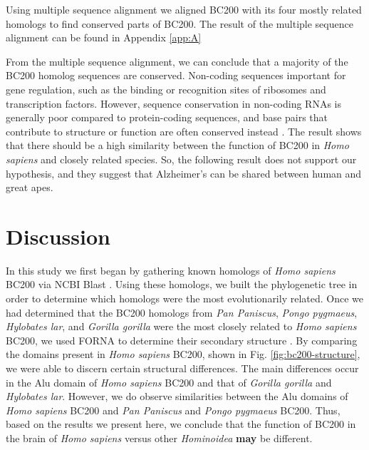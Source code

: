\documentclass[conference, 11pt]{IEEEtran}
\begin{document}
Using multiple sequence alignment we aligned BC200 with its four mostly related homologs to find conserved parts of BC200. 
The result of the multiple sequence alignment can be found in Appendix \ref{app:A}

From the multiple sequence alignment, we can conclude that a majority of the BC200 homolog sequences are conserved. 
Non-coding sequences important for gene regulation, such as the binding or recognition sites of ribosomes and transcription factors. 
However, sequence conservation in non-coding RNAs is generally poor compared to protein-coding sequences, and base pairs that contribute to structure or function are often conserved instead \cite{johnsson2014evolutionary}. 
The result shows that there should be a high similarity between the function of BC200 in \emph{Homo sapiens} and closely related species. 
So, the following result does not support our hypothesis, and they suggest that Alzheimer’s can be shared between human and great apes.

\section{Discussion}\label{sec:discussion}

In this study we first began by gathering known homologs of \emph{Homo sapiens} BC200 via NCBI Blast \cite{blastTool,madden2012blast}. 
Using these homologs, we built the phylogenetic tree in order to determine which homologs were the most evolutionarily related. 
Once we had determined that the BC200 homologs from \emph{Pan Paniscus}, \emph{Pongo pygmaeus}, \emph{Hylobates lar}, and \emph{Gorilla gorilla} were the most closely related to \emph{Homo sapiens} BC200, we used FORNA to determine their secondary structure \cite{lorenz2011viennarna}. 
By comparing the domains present in \emph{Homo sapiens} BC200, shown in Fig. \ref{fig:bc200-structure}, we were able to discern certain structural differences. 
The main differences occur in the Alu domain of \emph{Homo sapiens} BC200 and that of \emph{Gorilla gorilla} and \emph{Hylobates lar}. 
However, we do observe similarities between the Alu domains of \emph{Homo sapiens} BC200 and \emph{Pan Paniscus} and \emph{Pongo pygmaeus} BC200. 
Thus, based on the results we present here, we conclude that the function of BC200 in the brain of \emph{Homo sapiens} versus other \emph{Hominoidea} \textbf{may} be different. 
\end{document}
